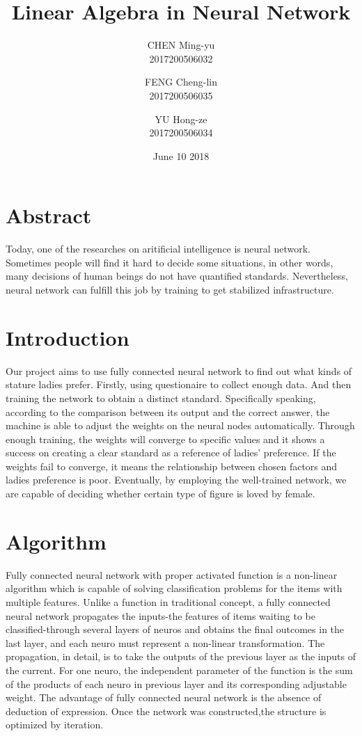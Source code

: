 \documentclass{article}
\title{Linear Algebra in Neural Network}
\author{CHEN Ming-yu\\2017200506032\\
    \and FENG Cheng-lin\\2017200506035\\
    \and YU Hong-ze\\2017200506034\\}
\date{June 10 2018}
\begin{document}
    \maketitle
    \begin{spacing}{2}
    \linespread{2}
    \section{Abstract}
    Today, one of the researches on aritificial intelligence is neural network. Sometimes people will find it hard to decide some situations, in other words, many decisions of human beings do not have quantified standards. Nevertheless, neural network can fulfill this job by training to get stabilized infrastructure.

    \section{Introduction}
    Our project aims to use fully connected neural network to find out what kinds of stature ladies prefer. Firstly, using questionaire to collect enough data. And then training the network to obtain a distinct standard. Specifically speaking, according to the comparison between its output and the correct answer, the machine is able to adjust the weights on the neural nodes automatically. Through enough training, the weights will converge to specific values and it shows a success on creating a clear standard as a reference of ladies' preference. If the weights fail to converge, it means the relationship between chosen factors and ladies preference is poor. Eventually, by employing the well-trained network, we are capable of deciding whether certain type of figure is loved by female.
    \section{Algorithm}

    Fully connected neural network with proper activated function is a non-linear algorithm which is capable of solving classification problems for the items with multiple features. Unlike a function in traditional concept, a fully connected neural network propagates the inputs-the features of items waiting to be classified-through several layers of neuros and obtains the final outcomes in the last layer, and each neuro must represent a non-linear transformation. The propagation, in detail, is to take the outputs of the previous layer as the inputs of the current. For one neuro, the independent parameter of the function is the sum of the products of each neuro in previous layer and its corresponding adjustable weight. The advantage of fully connected neural network is the absence of deduction of expression. Once the network was constructed,the structure is optimized by iteration. 


\end{spacing}
\end{document}
